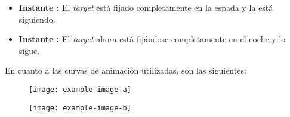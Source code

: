 \begin{itemize}
    \item \textbf{Instante : }El \textit{target} está fijado completamente en la espada y la está siguiendo.
    \item \textbf{Instante : }El \textit{target} ahora está fijándose completamente en el coche y lo sigue.
\end{itemize}

\bigskip

En cuanto a las curvas de animación utilizadas, son las siguientes:

\begin{figure}[H]
    \centering
   \texttt{[image: example-image-a]}
\end{figure}
\begin{figure}[H]
    \centering
   \texttt{[image: example-image-b]}
\end{figure}

\blindtext